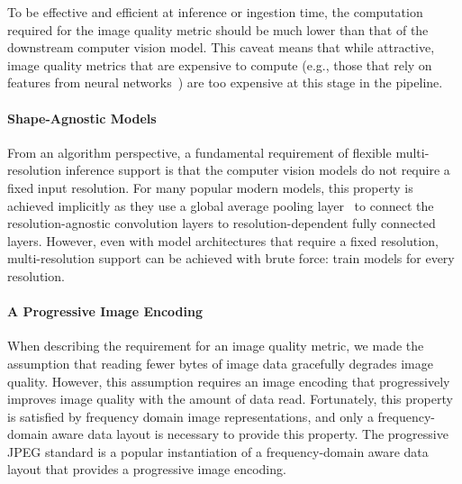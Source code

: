 To be effective and efficient at inference or ingestion time, the computation required for the image quality metric should be much lower than that of the downstream computer vision model.
This caveat means that while attractive, image quality metrics that are expensive to compute (e.g., those that rely on features from neural networks~\cite{zhang2018unreasonable}) are too expensive at this stage in the pipeline.

\paragraph{Shape-Agnostic Models}
From an algorithm perspective, a fundamental requirement of flexible multi-resolution inference support is that the computer vision models do not require a fixed input resolution.
For many popular modern models, this property is achieved implicitly as they use a global average pooling layer~\cite{zhou2016learning} to connect the resolution-agnostic convolution layers to resolution-dependent fully connected layers.
However, even with model architectures that require a fixed resolution, multi-resolution support can be achieved with brute force: train models for every resolution.

\paragraph{A Progressive Image Encoding}
When describing the requirement for an image quality metric, we made the assumption that reading fewer bytes of image data gracefully degrades image quality.
However, this assumption requires an image encoding that progressively improves image quality with the amount of data read.
Fortunately, this property is satisfied by frequency domain image representations, and only a frequency-domain aware data layout is necessary to provide this property.
The progressive JPEG standard is a popular instantiation of a frequency-domain aware data layout that provides a progressive image encoding.

